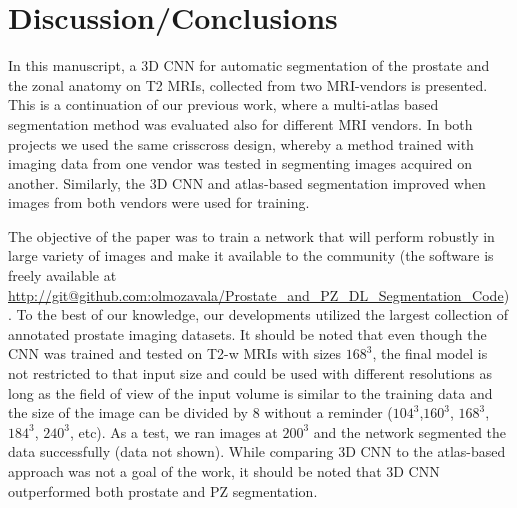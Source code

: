 \section{Discussion/Conclusions}
\label{sec:disc}
In this manuscript, a 3D CNN for automatic segmentation of the prostate and the zonal anatomy on T2 MRIs, collected from two MRI-vendors is presented. This is a continuation of our previous work, where a multi-atlas based segmentation method was evaluated also for different MRI vendors. In both projects we used the same crisscross design, whereby a method trained with imaging data from one vendor was tested in segmenting images acquired on another. Similarly, the 3D CNN and atlas-based segmentation improved when images from both vendors were used for training. 

The objective of the paper was to train a network that will perform robustly in large variety of images and make it available to the community (the software is freely available at \url{http://git@github.com:olmozavala/Prostate_and_PZ_DL_Segmentation_Code}). To the best of our knowledge, our developments utilized the largest collection of annotated prostate imaging datasets. It should be noted that even though the CNN was trained and tested on T2-w MRIs with sizes $168^3$, the final model is not restricted to that input size and could be used with different resolutions as long as the field of view of the input volume is similar to the training data and the size of the image can be divided by 8 without a reminder ($104^3$,$160^3$, $168^3$, $184^3$, $240^3$, etc). As a test, we ran images at $200^3$ and the network segmented the data successfully (data not shown). While comparing 3D CNN to the atlas-based approach was not a goal of the work, it should be noted that 3D CNN outperformed both prostate and PZ segmentation.  

